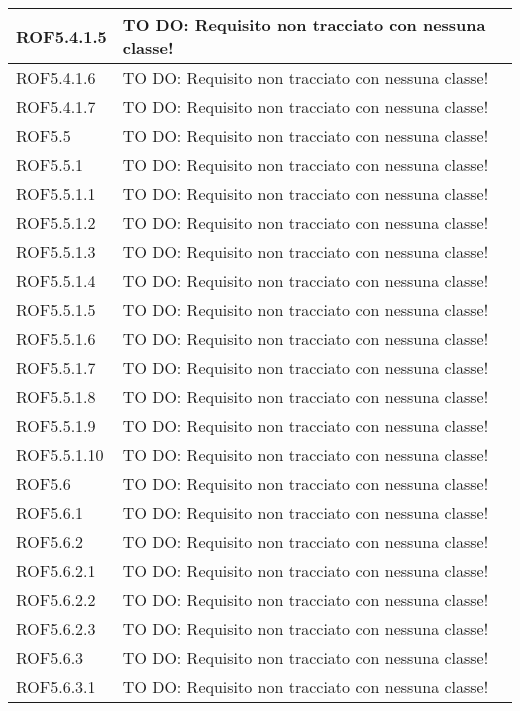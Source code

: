 \begin{center}
\begin{longtable}{| p{4cm} | p{8cm} |}
\hline
ROF5.4.1.5 & TO DO: Requisito non tracciato con nessuna classe! \\
\hline
ROF5.4.1.6 & TO DO: Requisito non tracciato con nessuna classe! \\
\hline
ROF5.4.1.7 & TO DO: Requisito non tracciato con nessuna classe! \\
\hline
ROF5.5 & TO DO: Requisito non tracciato con nessuna classe! \\
\hline
ROF5.5.1 & TO DO: Requisito non tracciato con nessuna classe! \\
\hline
ROF5.5.1.1 & TO DO: Requisito non tracciato con nessuna classe! \\
\hline
ROF5.5.1.2 & TO DO: Requisito non tracciato con nessuna classe! \\
\hline
ROF5.5.1.3 & TO DO: Requisito non tracciato con nessuna classe! \\
\hline
ROF5.5.1.4 & TO DO: Requisito non tracciato con nessuna classe! \\
\hline
ROF5.5.1.5 & TO DO: Requisito non tracciato con nessuna classe! \\
\hline
ROF5.5.1.6 & TO DO: Requisito non tracciato con nessuna classe! \\
\hline
ROF5.5.1.7 & TO DO: Requisito non tracciato con nessuna classe! \\
\hline
ROF5.5.1.8 & TO DO: Requisito non tracciato con nessuna classe! \\
\hline
ROF5.5.1.9 & TO DO: Requisito non tracciato con nessuna classe! \\
\hline
ROF5.5.1.10 & TO DO: Requisito non tracciato con nessuna classe! \\
\hline
ROF5.6 & TO DO: Requisito non tracciato con nessuna classe! \\
\hline
ROF5.6.1 & TO DO: Requisito non tracciato con nessuna classe! \\
\hline
ROF5.6.2 & TO DO: Requisito non tracciato con nessuna classe! \\
\hline
ROF5.6.2.1 & TO DO: Requisito non tracciato con nessuna classe! \\
\hline
ROF5.6.2.2 & TO DO: Requisito non tracciato con nessuna classe! \\
\hline
ROF5.6.2.3 & TO DO: Requisito non tracciato con nessuna classe! \\
\hline
ROF5.6.3 & TO DO: Requisito non tracciato con nessuna classe! \\
\hline
ROF5.6.3.1 & TO DO: Requisito non tracciato con nessuna classe! \\

\end{longtable}
\end{center}
